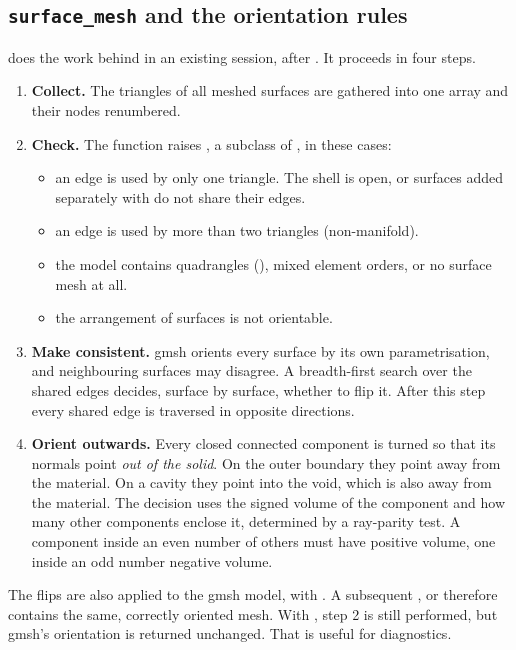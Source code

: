 \subsection{\texttt{surface\_mesh} and the orientation rules}

 does the work behind  in an existing session,
after . It proceeds in four steps.

\begin{enumerate}
  \item \textbf{Collect.} The triangles of all meshed surfaces are gathered into one array and
    their nodes renumbered.
  \item \textbf{Check.} The function raises , a subclass of
    , in these cases:
    \begin{itemize}
      \item an edge is used by only one triangle. The shell is open, or surfaces added
        separately with  do not share their edges.
      \item an edge is used by more than two triangles (non-manifold).
      \item the model contains quadrangles (), mixed element orders,
        or no surface mesh at all.
      \item the arrangement of surfaces is not orientable.
    \end{itemize}
  \item \textbf{Make consistent.} gmsh orients every surface by its own parametrisation, and
    neighbouring surfaces may disagree. A breadth-first search over the shared edges decides,
    surface by surface, whether to flip it. After this step every shared edge is traversed in
    opposite directions.
  \item \textbf{Orient outwards.} Every closed connected component is turned so that its
    normals point \emph{out of the solid}. On the outer boundary they point away from the
    material. On a cavity they point into the void, which is also away from the material. The
    decision uses the signed volume of the component and how many other components enclose
    it, determined by a ray-parity test. A component inside an even number of others must have
    positive volume, one inside an odd number negative volume.
\end{enumerate}

The flips are also applied to the gmsh model, with . A
subsequent ,  or  therefore contains the same,
correctly oriented mesh. With , step 2 is still performed, but gmsh's
orientation is returned unchanged. That is useful for diagnostics.

